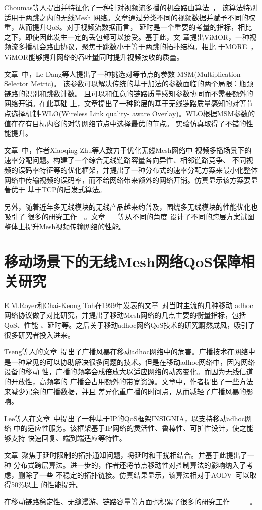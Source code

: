 Choumas等人提出并特征化了一种针对视频流多播的机会路由算法~\cite{vimor}，
该算法特别适用于两跳之内的无线Mesh
网络。文章通过分类不同的视频数据并赋予不同的权重，从而提升QoS。对于视频流数据而言，
延时是一个重要的考量的指标，相比之下，即使因此发生一定的丢包都可以接受。基于此，文
章提出ViMOR，一种视频流多播机会路由协议，聚焦于跳数小于等于两跳的拓扑结构。相比
于MORE~\cite{MORE}，ViMOR能够提升网络的吞吐量同时提升视频接收的质量。

文章~\cite{MSM-WLO}中，Le Dang等人提出了一种挑选对等节点的参数-MSM(Multiplication 
Selector Metric)。
该参数可以解决传统的基于加法的参数面临的两个局限：瓶颈链路的识别和跳数计数。
且可以和任意的链路质量感知参数协同而不需要额外的网络开销。在此基础
上，文章提出了一种跨层的基于无线链路质量感知的对等节点选择机制-WLO(Wireless Link quality-
aware Overlay)。WLO根据MSM参数的值在存有目标内容的对等网络节点中选择最优的节点。
实验仿真取得了不错的性能提升。

文章~\cite{rateallocation}中，作者Xiaoqing Zhu等人致力于优化无线Mesh网络中
视频多播场景下的速率分配问题。构建了一个综合无线链路容量各向异性、相邻链路竞争、
不同视频的误码率特征等的优化框架，并提出了一种分布式的速率分配方案来最小化整体
网络中传输视频的误码率，而不给网络带来额外的网络开销。仿真显示该方案要显著优于
基于TCP的启发式算法。

另外，随着近年多无线模块的无线产品越来约普及，围绕多无线模块的性能优化也吸引了
很多的研究工作~\cite{ABI}~\cite{crosslayermultiradio}。文章~\cite{crosslayervideostream}
~\cite{crosslayeroptimization}~\cite{crosslayervideotransmission}等从不同的角度
设计了不同的跨层方案试图整体上提升Mesh视频传输网络的性能。

\section{移动场景下的无线Mesh网络QoS保障相关研究}
E.M.Royer和Chai-Keong Toh在1999年发表的文章~\cite{review}对当时主流的几种移动
adhoc网络协议做了对比研究，并提出了移动Mesh网络的几点主要的衡量指标，包括QoS、性能
、延时等。之后关于移动adhoc网络QoS技术的研究蔚然成风，吸引了很多研究者投入进来。

Tseng等人的文章~\cite{broadcaststorm}提出了广播风暴在移动adhoc网络中的危害。广播技术在网络中
是一种常见的可以协助解决很多问题的技术。但是在移动adhoc网络中，因为网络设备的移动
性，广播的频率会成倍放大以适应网络的动态变化。而因为无线信道的开放性，高频率的
广播会占用额外的带宽资源。文章中，作者提出了一些方法来减少冗余的广播数据，并且
差异化重广播的时间点，从而减轻了广播风暴的影响。

Lee等人在文章~\cite{insignia}中提出了一种基于IP的QoS框架INSIGNIA，以支持移动adhoc网络
中的适应性服务。该框架基于IP网络的灵活性、鲁棒性、可扩性设计，使之能够支持
快速回复、端到端适应等特性。

文章~\cite{ITCD}聚焦于延时限制的拓扑通知问题，将延时和干扰相结合。并基于此提出了一种
分布式跨层算法。进一步的，作者还将节点移动性对控制算法的影响纳入了考虑，删除了一些
不稳定的拓扑链接。仿真结果显示，该算法相对于AODV~\cite{AODV}可以取得50\%以上
的性能提升。

在移动链路稳定性、无缝漫游、链路容量等方面也积累了很多的研究工作~\cite{mobilitysurvey}
~\cite{2007mobility}~\cite{2002link}~\cite{2001mobility}~\cite{study}。





